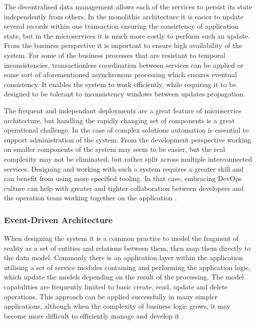 The decentralised data management allows each of the services to persist its state independently from others. In the monolithic architecture it is easier to update several records within one transaction ensuring the consistency of application state, but in the microservices it is much more costly to perform such an update. From the business perspective it is important to ensure high availability of the system. For some of the business processes that are resistant to temporal inconsistencies, transactionless coordination between services can be applied or some sort of aforementioned asynchronous processing which ensures eventual consistency. It enables the system to work efficiently, while requiring it to be designed to be tolerant to inconsistency windows between updates propagation.

The frequent and independant deployments are a great feature of microservice architecture, but handling the rapidly changing set of components is a great operational challenge. In the case of complex solutions automation is essential to support administration of the system. From the development perspective working on smaller components of the system may seem to be easier, but the real complexity may not be eliminated, but rather split across multiple interconnected services. Designing and working with such a system requires a greater skill and can benefit from using more specified tooling. In that case, embracing DevOps culture can help with greater and tighter collaboration between developers and the operation team working together on the application \cite{FowlerMicroservicesTradeoffs}.

\subsubsection*{Event-Driven Architecture}

When designing the system it is a common practice to model the fragment of reality as a set of entities and relations between them, then map them directly to the data model. Commonly there is an application layer within the application utilising a set of service modules containing and performing the application logic, which update the models depending on the result of the processing. The model capabilities are frequently limited to basic create, read, update and delete operations. This approach can be applied successfully in many simpler applications, although when the complexity of business logic grows, it may become more difficult to efficiently manage and develop it \cite{FowlerAnemicModel}.

